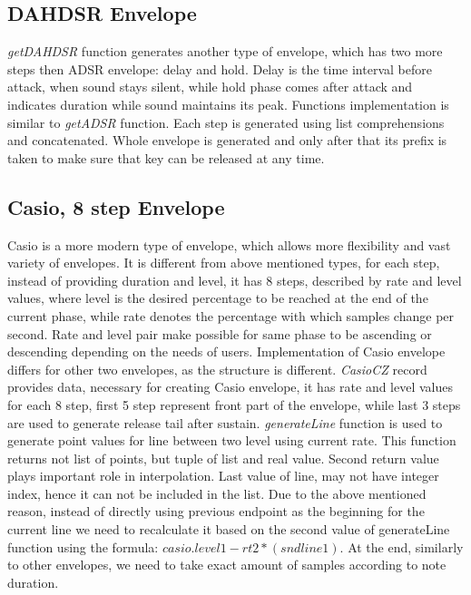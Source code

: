 \documentclass[runningheads]{llncs}
\begin{document}
\subsection{DAHDSR Envelope}

\textit{getDAHDSR} function generates another type of envelope, which has two more steps then ADSR envelope: delay and hold. Delay is the time interval before attack, when sound stays silent, while hold phase comes after attack and indicates duration while sound maintains its peak. Functions implementation is similar to \textit{getADSR} function. Each step is generated using list comprehensions and concatenated. Whole envelope is generated and only after that its prefix is taken to make sure that key can be released at any time.

\subsection{Casio, 8 step Envelope}

Casio is a more modern type of envelope, which allows more flexibility and vast variety of envelopes. It is different from above mentioned types, for each step, instead of providing duration and level, it has 8 steps, described by rate and level values, where level is the desired percentage to be reached at the end of the current phase, while rate denotes the percentage with which samples change per second. Rate and level pair make possible for same phase to be ascending or descending depending on the needs of users. Implementation of Casio envelope differs for other two envelopes, as the structure is different. \textit{CasioCZ} record provides data, necessary for creating Casio envelope, it has rate and level values for each 8 step, first 5 step represent front part of the envelope, while last 3 steps are used to generate release tail after sustain. \textit{generateLine} function is used to generate point values for line between two level using current rate. This function returns not  list of points, but tuple of list and real value. Second return value plays important role in interpolation. Last value of line, may not have integer index, hence it can not be included in the list. Due to the above mentioned reason, instead of directly using previous endpoint as the beginning for the current line we need to recalculate it based on the second value of generateLine function using the formula: \(casio.level1-rt2*(snd  line1)\). At the end, similarly to other envelopes, we need to take exact amount of samples according to note duration.
\end{document}

